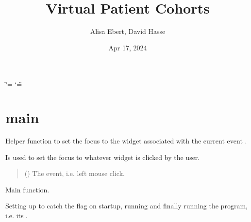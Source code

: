 \documentclass[letterpaper,10pt,english]{sphinxmanual}
\title{Virtual Patient Cohorts}
\date{Apr 17, 2024}
\author{Alisa Ebert, David Hasse}
\begin{document}
\ifdefined\shorthandoff
  \ifnum\catcode`\=\string=\active\shorthandoff{=}\fi
  \ifnum\catcode`\"=\active{}\fi
\fi

\pagestyle{empty}
\sphinxmaketitle
\pagestyle{plain}
\sphinxtableofcontents
\pagestyle{normal}
\label{\detokenize{index::doc}}


\sphinxstepscope


\chapter{main}
\label{\detokenize{main:module-main}}\label{\detokenize{main:main}}\label{\detokenize{main::doc}}

\begin{fulllineitems}
\label{\detokenize{main:main.handle_leftclick}}
\pysigstartsignatures
{}
\pysigstopsignatures
\sphinxAtStartPar
Helper function to set the focus to the widget associated with the current event .

\sphinxAtStartPar
Is used to set the focus to whatever widget is clicked by the user.
\begin{quote}\begin{description}
\sphinxAtStartPar
{} () \textendash{} The event, i.e. left mouse click.

\end{description}\end{quote}

\end{fulllineitems}


\begin{fulllineitems}
\label{\detokenize{main:main.main}}
\pysigstartsignatures
{}
\pysigstopsignatures
\sphinxAtStartPar
Main function.

\sphinxAtStartPar
Setting up  to catch the  flag on startup, running 
and finally running the program, i.e. its .

\end{fulllineitems}
\end{document}

